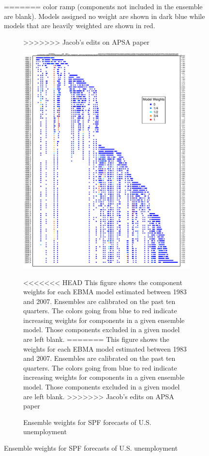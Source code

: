 \documentclass[12pt,fullpage,endnotes]{article}
\begin{document}
\begin{figure}[h]
\caption{Model weights with rolling EBMA calibration window}
=======
color ramp (components not included in the ensemble are blank).
Models assigned no weight are shown in dark blue while models that are
heavily weighted are shown in red.

\begin{figure}[h]
\caption{Ensemble weights for SPF forecasts of U.S. unemployment}
>>>>>>> Jacob's edits on APSA paper
\label{modelWeights}
\begin{center}
\includegraphics[scale=.95]{awesome}
\end{center}

<<<<<<< HEAD
\footnotesize This figure shows the component weights for each EBMA model estimated between 1983 and 2007. Ensembles are calibrated on the past ten quarters. The colors going from blue to red indicate increasing weights for components in a given ensemble model. Those components excluded in a given model are left blank.
=======
\footnotesize This figure shows the weights for each EBMA model
estimated between 1983 and 2007. Ensembles are calibrated on the past
ten quarters. The colors going from blue to red indicate increasing
weights for components in a given ensemble model. Those components
excluded in a given model are left blank.
>>>>>>> Jacob's edits on APSA paper


\end{figure}
\end{figure}
\end{document}
